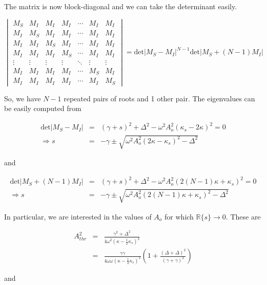 The matrix is now block-diagonal and we can take the determinant easily.

\begin{equation}
\begin{vmatrix}
M_S & M_I & M_I & M_I & \cdots & M_I & M_I \\
M_I & M_S & M_I & M_I & \cdots & M_I & M_I \\
M_I & M_I & M_S & M_I & \cdots & M_I & M_I \\
M_I & M_I & M_I & M_S & \cdots & M_I & M_I \\
\vdots & \vdots & \vdots & \vdots & \ddots & \vdots & \vdots \\
M_I & M_I & M_I & M_I & \cdots & M_S & M_I \\
M_I & M_I & M_I & M_I & \cdots & M_I & M_S 
\end{vmatrix}
= \mathrm{det}\left|M_S-M_I\right|^{N-1}\mathrm{det}\left|M_S+(N-1)M_I\right|
\end{equation}

So, we have $N-1$ repeated pairs of roots and 1 other pair. The eigenvalues can be easily computed from

\begin{eqnarray}
\mathrm{det}\left|M_S-M_I\right| & = & (\gamma+s)^2 +\Delta^2 - \omega^2 A_o^2(\kappa_s-2\kappa)^2 = 0 \\
\Rightarrow s & = & -\gamma \pm \sqrt{\omega^2 A_o^2 (2\kappa - \kappa_s)^2 - \Delta^2} 
\end{eqnarray}

and 

\begin{eqnarray}
\mathrm{det}\left|M_S+(N-1)M_I\right| & = & (\gamma+s)^2 + \Delta^2 - \omega^2 A_o^2 (2(N-1)\kappa + \kappa_s)^2  =  0 \\
\Rightarrow s & = & -\gamma \pm \sqrt{\omega^2 A_o^2 (2(N-1)\kappa + \kappa_s)^2 - \Delta^2} 
\end{eqnarray}

In particular, we are interested in the values of $A_o$ for which $\mathbb{R}\{s\}\rightarrow 0$. These are 

\begin{eqnarray}
A_{thr}^2 & = & \frac{\gamma^2 + \Delta^2}{4\omega^2(\kappa-\frac{1}{2}\kappa_s)^2} \\
          & = & \frac{\gamma\gamma}{4\omega\omega(\kappa-\frac{1}{2}\kappa_s)^2}\left(1 + \frac{(\Delta+\Delta)^2}{(\gamma+\gamma)^2}\right) 
\end{eqnarray}

and 

